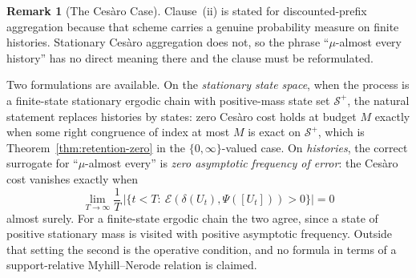 \documentclass[12pt]{article}
\theoremstyle{definition}
\newtheorem{remark}[theorem]{Remark}
\newcommand{\Splus}{\mathcal S^{+}}
\begin{document}
\begin{remark}[The Ces\`aro Case]
\label{rem:cesaro-boolean}
Clause~(ii) is stated for discounted-prefix aggregation because that scheme
carries a genuine probability measure on finite histories.  Stationary
Ces\`aro aggregation does not, so the phrase ``$\mu$-almost every history'' has
no direct meaning there and the clause must be reformulated.

Two formulations are available.  On the \emph{stationary state space}, when
the process is a finite-state stationary ergodic chain with positive-mass
state set $\Splus$, the natural statement replaces histories by states: zero
Ces\`aro cost holds at budget $M$ exactly when some right congruence of index
at most $M$ is exact on $\Splus$, which is
Theorem~\ref{thm:retention-zero} in the $\{0,\infty\}$-valued case.  On
\emph{histories}, the correct surrogate for ``$\mu$-almost every'' is
\emph{zero asymptotic frequency of error}: the Ces\`aro cost vanishes exactly
when
\[
\lim_{T\to\infty}\frac1T\,\bigl|\{t<T:\ \mathcal E(\delta(U_t),\Psi([U_t]))>0\}\bigr|
=0
\]
almost surely.  For a finite-state ergodic chain the two agree, since a state
of positive stationary mass is visited with positive asymptotic frequency.
Outside that setting the second is the operative condition, and no formula in
terms of a support-relative Myhill--Nerode relation is claimed.
\end{remark}
\end{document}
